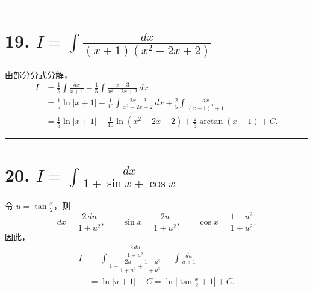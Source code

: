 \documentclass[11pt,a4paper,fontset=windows]{ctexart}
\begin{document}
\par{}\vspace{0.5em}\hrule\vspace{0.2em}
\section*{19. \(\displaystyle I=\int\frac{dx}{(x+1)(x^2-2x+2)}\)}

由部分分式分解，
\[
\begin{aligned}
I&=\frac15\int\frac{dx}{x+1}
-\frac15\int\frac{x-3}{x^2-2x+2}\,dx\\
&=\frac15\ln|x+1|
-\frac1{10}\int\frac{2x-2}{x^2-2x+2}\,dx
+\frac25\int\frac{dx}{(x-1)^2+1}\\
&=\boxed{\frac15\ln|x+1|-\frac1{10}\ln(x^2-2x+2)
+\frac25\arctan(x-1)+C}.
\end{aligned}
\]

\par{}\vspace{0.5em}\hrule\vspace{0.2em}
\section*{20. \(\displaystyle I=\int\frac{dx}{1+\sin x+\cos x}\)}

令 \(u=\tan\frac x2\)，则
\[
dx=\frac{2\,du}{1+u^2},\qquad
\sin x=\frac{2u}{1+u^2},\qquad
\cos x=\frac{1-u^2}{1+u^2}.
\]
因此，
\[
\begin{aligned}
I&=\int\frac{\dfrac{2\,du}{1+u^2}}
{1+\dfrac{2u}{1+u^2}+\dfrac{1-u^2}{1+u^2}}
=\int\frac{du}{u+1}\\
&=\boxed{\ln|u+1|+C
=\ln\left|\tan\frac x2+1\right|+C}.
\end{aligned}
\]
\end{document}
